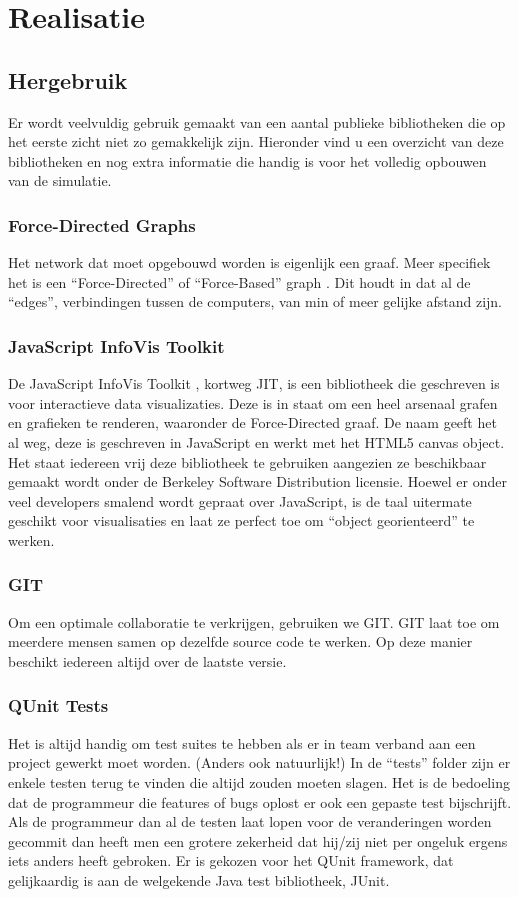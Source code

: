 \documentclass[a4paper,oneside]{report}
\begin{document}
\chapter{Realisatie}
\section{Hergebruik}
Er wordt veelvuldig gebruik gemaakt van een aantal publieke bibliotheken die op het eerste
zicht niet zo gemakkelijk zijn. Hieronder vind u een overzicht van deze bibliotheken en nog
extra informatie die handig is voor het volledig opbouwen van de simulatie.
\subsection{Force-Directed Graphs}
Het network dat moet opgebouwd worden is eigenlijk een graaf. Meer specifiek het is een
``Force-Directed'' of ``Force-Based'' graph \cite{ForceBasedGraph}.
Dit houdt in dat al de ``edges'', verbindingen tussen de computers, van min of meer gelijke afstand zijn.
\subsection{JavaScript InfoVis Toolkit}
De JavaScript InfoVis Toolkit \cite{InfoVis}, kortweg JIT, is een bibliotheek die geschreven is voor interactieve
data visualizaties. Deze is in staat om een heel arsenaal grafen en grafieken te renderen, waaronder
de Force-Directed graaf.
De naam geeft het al weg, deze is geschreven in JavaScript en werkt met het HTML5 canvas object.
Het staat iedereen vrij deze bibliotheek te gebruiken aangezien ze beschikbaar gemaakt wordt onder
de Berkeley Software Distribution licensie.
Hoewel er onder veel developers smalend wordt gepraat over JavaScript, is de taal uitermate geschikt voor visualisaties
en laat ze perfect toe om ``object georienteerd'' te werken.
\subsection{GIT}
Om een optimale collaboratie te verkrijgen, gebruiken we GIT.
GIT laat toe om meerdere mensen samen op dezelfde source code te werken.
Op deze manier beschikt iedereen altijd over de laatste versie.
\subsection{QUnit Tests}
Het is altijd handig om test suites te hebben als er in team verband aan een project gewerkt moet worden. (Anders ook natuurlijk!)
In de ``tests'' folder zijn er enkele testen terug te vinden die altijd zouden moeten slagen.
Het is de bedoeling dat de programmeur die features of bugs oplost er ook een gepaste test bijschrijft.
Als de programmeur dan al de testen laat lopen voor de veranderingen worden gecommit dan heeft men een 
grotere zekerheid dat hij/zij niet per ongeluk ergens iets anders heeft gebroken.
Er is gekozen voor het QUnit framework, dat gelijkaardig is aan de welgekende Java test bibliotheek, JUnit.
\end{document}
